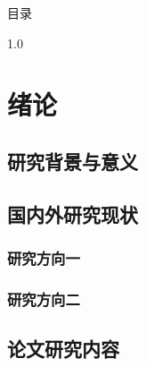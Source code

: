 \documentclass[12pt, a4paper, UTF8]{ctexart}
\numberwithin{equation}{section}
\begin{document}
\clearpage
\thispagestyle{empty}
\begin{center}
  {\heiti 目\quad 录}
\end{center}
\vspace{1\baselineskip}

\begin{spacing}{1.0}
  \tableofcontents
\end{spacing}

\clearpage

\setcounter{page}{1}
\pagestyle{fancy}

\section{绪论}

\subsection{研究背景与意义}


\subsection{国内外研究现状}

\subsubsection{研究方向一}


\subsubsection{研究方向二}


\subsection{论文研究内容}

\end{document}
